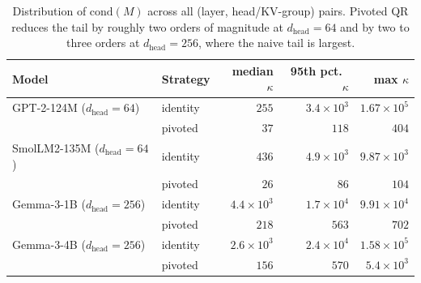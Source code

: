 \documentclass{article}
\begin{document}
\begin{table}[h!] \centering
\caption{Distribution of $\text{cond}(M)$ across all (layer, head/KV-group) pairs. Pivoted QR reduces the tail by roughly two orders of magnitude at $d_\text{head} = 64$ and by two to three orders at $d_\text{head} = 256$, where the naive tail is largest.}
\label{tab:matshrink-cond}
\begin{tabular}{l l r r r}
\hline
Model & Strategy & median $\kappa$ & 95th pct.\ $\kappa$ & max $\kappa$ \\
\hline
GPT-2-124M ($d_\text{head}{=}64$)   & identity & $255$     & $3.4 \times 10^3$ & $1.67 \times 10^5$ \\
                                    & pivoted  & $37$      & $118$             & $404$ \\
\hline
SmolLM2-135M ($d_\text{head}{=}64$) & identity & $436$     & $4.9 \times 10^3$ & $9.87 \times 10^3$ \\
                                    & pivoted  & $26$      & $86$              & $104$ \\
\hline
Gemma-3-1B ($d_\text{head}{=}256$)  & identity & $4.4 \times 10^3$ & $1.7 \times 10^4$ & $9.91 \times 10^4$ \\
                                    & pivoted  & $218$     & $563$             & $702$ \\
\hline
Gemma-3-4B ($d_\text{head}{=}256$)  & identity & $2.6 \times 10^3$ & $2.4 \times 10^4$ & $1.58 \times 10^5$ \\
                                    & pivoted  & $156$     & $570$             & $5.4 \times 10^3$ \\
\hline
\end{tabular}
\end{table}
\end{document}

